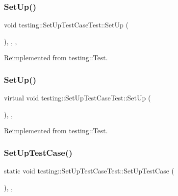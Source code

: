 \subsubsection{\texorpdfstring{SetUp()}{SetUp()}\hspace{0.1cm}{\footnotesize\ttfamily [2/3]}}
{\footnotesize\ttfamily void testing\+::\+Set\+Up\+Test\+Case\+Test\+::\+Set\+Up (\begin{DoxyParamCaption}{ }\end{DoxyParamCaption})\hspace{0.3cm}{\ttfamily [inline]}, {\ttfamily [override]}, {\ttfamily [protected]}, {\ttfamily [virtual]}}



Reimplemented from \mbox{\hyperlink{classtesting_1_1_test_a190315150c303ddf801313fd1a777733}{testing\+::\+Test}}.

\mbox{\label{classtesting_1_1_set_up_test_case_test_a4b44551ccf73e66de7ec95b2ab3b2085}} 
\subsubsection{\texorpdfstring{SetUp()}{SetUp()}\hspace{0.1cm}{\footnotesize\ttfamily [3/3]}}
{\footnotesize\ttfamily virtual void testing\+::\+Set\+Up\+Test\+Case\+Test\+::\+Set\+Up (\begin{DoxyParamCaption}{ }\end{DoxyParamCaption})\hspace{0.3cm}{\ttfamily [inline]}, {\ttfamily [protected]}, {\ttfamily [virtual]}}



Reimplemented from \mbox{\hyperlink{classtesting_1_1_test_a190315150c303ddf801313fd1a777733}{testing\+::\+Test}}.

\mbox{\label{classtesting_1_1_set_up_test_case_test_a50732abc0bcb3725e6dfd6a2d487e944}} 
\subsubsection{\texorpdfstring{SetUpTestCase()}{SetUpTestCase()}\hspace{0.1cm}{\footnotesize\ttfamily [1/3]}}
{\footnotesize\ttfamily static void testing\+::\+Set\+Up\+Test\+Case\+Test\+::\+Set\+Up\+Test\+Case (\begin{DoxyParamCaption}{ }\end{DoxyParamCaption})\hspace{0.3cm}{\ttfamily [inline]}, {\ttfamily [static]}, {\ttfamily [protected]}}

